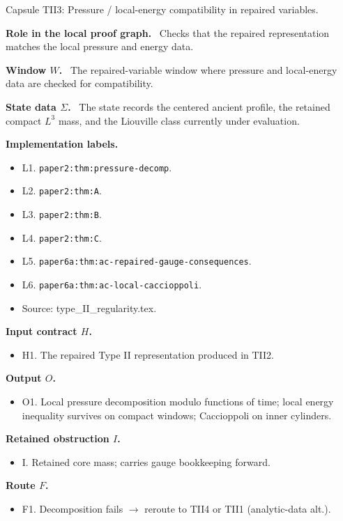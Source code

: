 \documentclass[11pt]{amsart}
\newcommand{\capsulefield}[1]{\par\smallskip\noindent\textbf{#1.}\ }
\begin{document}
\begin{proofcapsule}{Capsule TII3: Pressure / local-energy compatibility in repaired variables.}
  \capsulefield{Role in the local proof graph}
  Checks that the repaired representation matches the local pressure and energy data.

  \capsulefield{Window \(W\)}
The repaired-variable window where pressure and local-energy data are checked for compatibility.

  \capsulefield{State data \(\Sigma\)}
The state records the centered ancient profile, the retained compact $L^3$ mass, and the Liouville class currently under evaluation.

  \capsulefield{Implementation labels}
  \begin{itemize}[leftmargin=1.8em]
  \item L1. \texttt{paper2:thm:pressure-decomp}.
  \item L2. \texttt{paper2:thm:A}.
  \item L3. \texttt{paper2:thm:B}.
  \item L4. \texttt{paper2:thm:C}.
  \item L5. \texttt{paper6a:thm:ac-repaired-gauge-consequences}.
  \item L6. \texttt{paper6a:thm:ac-local-caccioppoli}.
  \item Source: type\_II\_regularity.tex.
  \end{itemize}

  \capsulefield{Input contract \(H\)}
  \begin{itemize}[leftmargin=1.8em]
  \item H1. The repaired Type II representation produced in TII2.
  \end{itemize}

  \capsulefield{Output \(O\)}
  \begin{itemize}[leftmargin=1.8em]
  \item O1. Local pressure decomposition modulo functions of time; local energy inequality survives on compact windows; Caccioppoli on inner cylinders.
  \end{itemize}

  \capsulefield{Retained obstruction \(I\)}
  \begin{itemize}[leftmargin=1.8em]
  \item I. Retained core mass; carries gauge bookkeeping forward.
  \end{itemize}

  \capsulefield{Route \(F\)}
  \begin{itemize}[leftmargin=1.8em]
  \item F1. Decomposition fails $\to$ reroute to TII4 or TII1 (analytic-data alt.).
  \end{itemize}


\end{proofcapsule}
\end{document}
